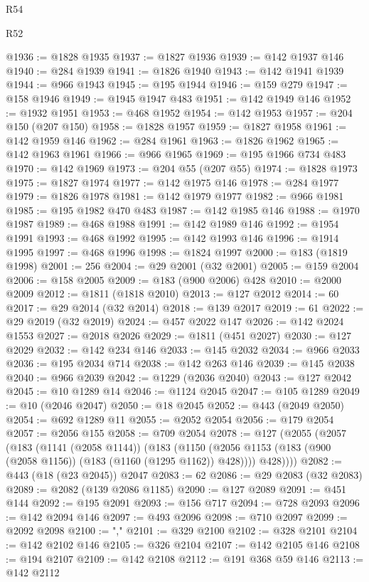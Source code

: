 \begin{lexlean}{R54}
\begin{lexlean}{R52}
\begin{coremodule}
{{{{{{{{{{{{{{{{{{{{{{{{{{{{{{{{{{{{{{{{{{{{{{{{{{{{{{{{{{{{{{{{{{{{{{{{{{{{{{{{{{{{{{{{{{{{{{{{{{{{{{{{{{{{{{{{{{{{{{{{{{{{{{{{{{{{{{{{{{{{{{{{{{{{{{{{{{{{{{{{{{{{{{{{{{{{{{{{{{{{{{{{{{{{{{{{{{{{{{@1936 := @1828 @1935
@1937 := @1827 @1936
@1939 := @142 @1937 @146
@1940 := @284 @1939
@1941 := @1826 @1940
@1943 := @142 @1941 @1939
@1944 := @966 @1943
@1945 := @195 @1944
@1946 := @159 @279
@1947 := @158 @1946
@1949 := @1945 @1947 @483
@1951 := @142 @1949 @146
@1952 := @1932 @1951
@1953 := @468 @1952
@1954 := @142 @1953
@1957 := @204 @150 (@207 @150)
@1958 := @1828 @1957
@1959 := @1827 @1958
@1961 := @142 @1959 @146
@1962 := @284 @1961
@1963 := @1826 @1962
@1965 := @142 @1963 @1961
@1966 := @966 @1965
@1969 := @195 @1966 @734 @483
@1970 := @142 @1969
@1973 := @204 @55 (@207 @55)
@1974 := @1828 @1973
@1975 := @1827 @1974
@1977 := @142 @1975 @146
@1978 := @284 @1977
@1979 := @1826 @1978
@1981 := @142 @1979 @1977
@1982 := @966 @1981
@1985 := @195 @1982 @470 @483
@1987 := @142 @1985 @146
@1988 := @1970 @1987
@1989 := @468 @1988
@1991 := @142 @1989 @146
@1992 := @1954 @1991
@1993 := @468 @1992
@1995 := @142 @1993 @146
@1996 := @1914 @1995
@1997 := @468 @1996
@1998 := @1824 @1997
@2000 := @183 (@1819 @1998)
@2001 := 256
@2004 := @29 @2001 (@32 @2001)
@2005 := @159 @2004
@2006 := @158 @2005
@2009 := @183 (@900 @2006) @428
@2010 := @2000 @2009
@2012 := @1811 (@1818 @2010)
@2013 := @127 @2012
@2014 := 60
@2017 := @29 @2014 (@32 @2014)
@2018 := @139 @2017
@2019 := 61
@2022 := @29 @2019 (@32 @2019)
@2024 := @457 @2022 @147
@2026 := @142 @2024 @1553
@2027 := @2018 @2026
@2029 := @1811 (@451 @2027)
@2030 := @127 @2029
@2032 := @142 @234 @146
@2033 := @145 @2032
@2034 := @966 @2033
@2036 := @195 @2034 @714
@2038 := @142 @263 @146
@2039 := @145 @2038
@2040 := @966 @2039
@2042 := @1229 (@2036 @2040)
@2043 := @127 @2042
@2045 := @10 @1289 @14
@2046 := @1124 @2045
@2047 := @105 @1289
@2049 := @10 (@2046 @2047)
@2050 := @18 @2045
@2052 := @443 (@2049 @2050)
@2054 := @692 @1289 @11
@2055 := @2052 @2054
@2056 := @179 @2054
@2057 := @2056 @155
@2058 := @709 @2054
@2078 := @127
    (@2055
      (@2057
        (@183
          (@1141 (@2058 @1144))
          (@183
            (@1150 (@2056 @1153 (@183 (@900 (@2058 @1156)) (@183 (@1160 (@1295 @1162)) @428))))
            @428))))
@2082 := @443 (@18 (@23 @2045)) @2047
@2083 := 62
@2086 := @29 @2083 (@32 @2083)
@2089 := @2082 (@139 @2086 @1185)
@2090 := @127 @2089
@2091 := @451 @144
@2092 := @195 @2091
@2093 := @156 @717
@2094 := @728 @2093
@2096 := @142 @2094 @146
@2097 := @493 @2096
@2098 := @710 @2097
@2099 := @2092 @2098
@2100 := ","
@2101 := @329 @2100
@2102 := @328 @2101
@2104 := @142 @2102 @146
@2105 := @326 @2104
@2107 := @142 @2105 @146
@2108 := @194 @2107
@2109 := @142 @2108
@2112 := @191 @368 @59 @146
@2113 := @142 @2112
}}}}}}}}}}}}}}}}}}}}}}}}}}}}}}}}}}}}}}}}}}}}}}}}}}}}}}}}}}}}}}}}}}}}}}}}}}}}}}}}}}}}}}}}}}}}}}}}}}}}}}}}}}}}}}}}}}}}}}}}}}}}}}}}}}}}}}}}}}}}}}}}}}}}}}}}}}}}}}}}}}}}}}}}}}}}}}}}}}}}}}}}}}}}}}}}}}}}}}
\end{coremodule}
\end{lexlean}
\end{lexlean}
